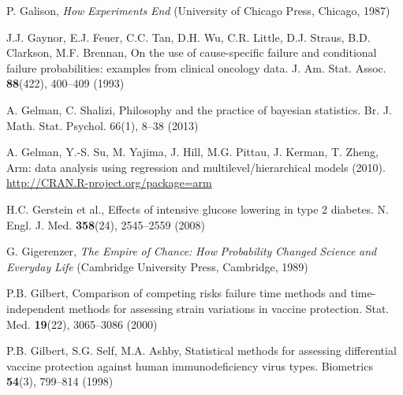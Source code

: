 \begin{list}{}{\setlength{\leftmargin}{2.1em}\setlength{\labelwidth}{0pt}
  \setlength{\labelsep}{0pt}\setlength{\itemindent}{-2.1em}
  \setlength{\parsep}{0pt}\setlength{\itemsep}{2pt}\setlength{\topsep}{0pt}}
\item\label{refentry:REF116}P. Galison, \textit{How} \textit{Experiments} \textit{End} (University of Chicago Press, Chicago, 1987)\label{refend:REF116}
\item\label{refentry:REF117}J.J. Gaynor, E.J. Feuer, C.C. Tan, D.H. Wu, C.R. Little, D.J. Straus, B.D. Clarkson, M.F. Brennan, On the use of cause-specific failure and conditional failure probabilities: examples from clinical oncology data. J. Am. Stat. Assoc. \textbf{88}(422), 400--409 (1993)\label{refend:REF117}
\item\label{refentry:REF118}A. Gelman, C. Shalizi, Philosophy and the practice of bayesian statistics. Br. J. Math. Stat. Psychol. 66(1), 8--38 (2013)\label{refend:REF118}
\item\label{refentry:REF119}A. Gelman, Y.-S. Su, M. Yajima, J. Hill, M.G. Pittau, J. Kerman, T. Zheng, Arm: data analysis using regression and multilevel/hierarchical models (2010). \url{http://CRAN.R-project.org/package=arm}\label{refend:REF119}
\item\label{refentry:REF120}H.C. Gerstein et al., Effects of intensive glucose lowering in type 2 diabetes. N. Engl. J. Med. \textbf{358}(24), 2545--2559 (2008)\label{refend:REF120}
\item\label{refentry:REF121}G. Gigerenzer, \textit{The} \textit{Empire} \textit{of} \textit{Chance:} \textit{How} \textit{Probability} \textit{Changed} \textit{Science} \textit{and} \textit{Everyday} \textit{Life} (Cambridge University Press, Cambridge, 1989)\label{refend:REF121}
\item\label{refentry:REF122}P.B. Gilbert, Comparison of competing risks failure time methods and time-independent methods for assessing strain variations in vaccine protection. Stat. Med. \textbf{19}(22), 3065--3086 (2000)\label{refend:REF122}
\item\label{refentry:REF123}P.B. Gilbert, S.G. Self, M.A. Ashby, Statistical methods for assessing differential vaccine protection against human immunodeficiency virus types. Biometrics \textbf{54}(3), 799--814 (1998)\label{refend:REF123}

\end{list}
